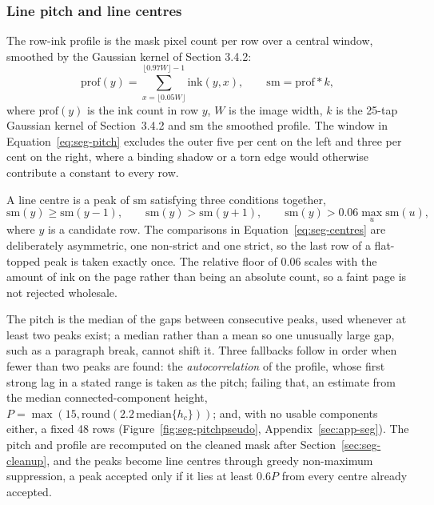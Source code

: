 \subsubsection{Line pitch and line centres}
\label{sec:seg-pitchcentres}

The row-ink profile is the mask pixel count per row over a central window, smoothed by the Gaussian kernel of Section 3.4.2:
\begin{equation}
\mathrm{prof}(y)=\sum_{x=\lfloor0.05W\rfloor}^{\lfloor0.97W\rfloor-1}\mathrm{ink}(y,x),\qquad \mathrm{sm}=\mathrm{prof}*k,
\label{eq:seg-pitch}
\end{equation}
where $\mathrm{prof}(y)$ is the ink count in row $y$, $W$ is the image width, $k$ is the 25-tap Gaussian kernel of Section~3.4.2 and $\mathrm{sm}$ the smoothed profile. The window in Equation~\ref{eq:seg-pitch} excludes the outer five per cent on the left and three per cent on the right, where a binding shadow or a torn edge would otherwise contribute a constant to every row.

A line centre is a peak of $\mathrm{sm}$ satisfying three conditions together,
\begin{equation}
\mathrm{sm}(y)\ge\mathrm{sm}(y-1),\qquad \mathrm{sm}(y)>\mathrm{sm}(y+1),\qquad \mathrm{sm}(y)>0.06\max_u\mathrm{sm}(u),
\label{eq:seg-centres}
\end{equation}
where $y$ is a candidate row. The comparisons in Equation~\ref{eq:seg-centres} are deliberately asymmetric, one non-strict and one strict, so the last row of a flat-topped peak is taken exactly once. The relative floor of $0.06$ scales with the amount of ink on the page rather than being an absolute count, so a faint page is not rejected wholesale.

The pitch is the median of the gaps between consecutive peaks, used whenever at least two peaks exist; a median rather than a mean so one unusually large gap, such as a paragraph break, cannot shift it. Three fallbacks follow in order when fewer than two peaks are found: the \emph{autocorrelation} of the profile, whose first strong lag in a stated range is taken as the pitch; failing that, an estimate from the median connected-component height, $P=\max(15,\mathrm{round}(2.2\,\mathrm{median}\{h_c\}))$; and, with no usable components either, a fixed 48 rows (Figure~\ref{fig:seg-pitchpseudo}, Appendix~\ref{sec:app-seg}). The pitch and profile are recomputed on the cleaned mask after Section~\ref{sec:seg-cleanup}, and the peaks become line centres through greedy non-maximum suppression, a peak accepted only if it lies at least $0.6P$ from every centre already accepted.

